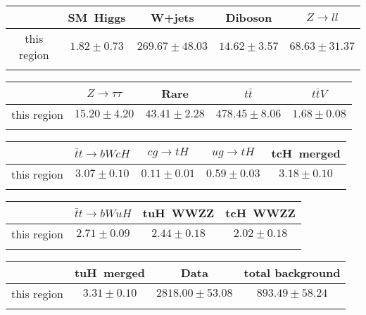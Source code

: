 \centering
\begin{tabular}{ccccc} \toprule\toprule
 & SM~Higgs & W+jets & Diboson & $Z\to ll$\\\midrule
this region & $1.82\pm0.73$ & $269.67\pm48.03$ & $14.62\pm3.57$ & $68.63\pm31.37$\\
\bottomrule\bottomrule\\
\end{tabular}
\begin{tabular}{ccccc} \toprule\toprule
 & $Z\to \tau\tau$ & Rare & $t\bar{t}$ & $t\bar{t}V$\\\midrule
this region & $15.20\pm4.20$ & $43.41\pm2.28$ & $478.45\pm8.06$ & $1.68\pm0.08$\\
\bottomrule\bottomrule\\
\end{tabular}
\begin{tabular}{ccccc} \toprule\toprule
 & $\bar{t}t\to bWcH$ & $cg\to tH$ & $ug\to tH$ & tcH~merged\\\midrule
this region & $3.07\pm0.10$ & $0.11\pm0.01$ & $0.59\pm0.03$ & $3.18\pm0.10$\\
\bottomrule\bottomrule\\
\end{tabular}
\begin{tabular}{cccc} \toprule\toprule
 & $\bar{t}t\to bWuH$ & tuH~WWZZ & tcH~WWZZ\\\midrule
this region & $2.71\pm0.09$ & $2.44\pm0.18$ & $2.02\pm0.18$\\
\bottomrule\bottomrule\\
\end{tabular}
\begin{tabular}{cccc} \toprule\toprule
 & tuH~merged & Data & total background\\\midrule
this region & $3.31\pm0.10$ & $2818.00\pm53.08$ & $893.49\pm58.24$\\
\bottomrule\bottomrule\\
\end{tabular}
